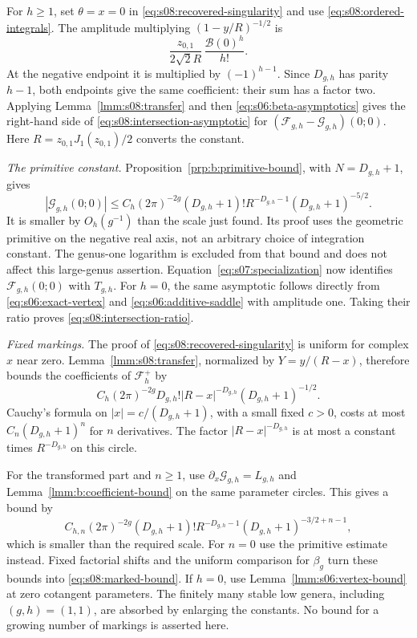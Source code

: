 \begin{prf}
For $h\geq1$, set $\theta=x=0$ in
\eqref{eq:s08:recovered-singularity} and use
\eqref{eq:s08:ordered-integrals}. The amplitude multiplying
$(1-y/R)^{-1/2}$ is
\[
 \frac{z_{0,1}}{2\sqrt2 R}\,
                         \frac{\mathcal B(0)^h}{h!}.
\]
At the negative endpoint it is multiplied by $(-1)^{h-1}$.
Since $D_{g,h}$ has parity $h-1$, both endpoints give the same
coefficient: their sum has a factor two. Applying
Lemma~\ref{lmm:s08:transfer} and then
\eqref{eq:s06:beta-asymptotics} gives the right-hand side of
\eqref{eq:s08:intersection-asymptotic} for
$(\mathcal F_{g,h}-\mathcal G_{g,h})(0;0)$.
Here $R=z_{0,1}J_1(z_{0,1})/2$ converts the constant.

\smallskip\noindent
\emph{The primitive constant.}
Proposition~\ref{prp:b:primitive-bound}, with $N=D_{g,h}+1$, gives
\[
 |\mathcal G_{g,h}(0;0)|
 \leq C_h(2\pi)^{-2g}(D_{g,h}+1)!
                  R^{-D_{g,h}-1}(D_{g,h}+1)^{-5/2}.
\]
It is smaller by $O_h(g^{-1})$ than the scale just found.
Its proof uses the geometric primitive on the negative real axis,
not an arbitrary choice of integration constant. The genus-one
logarithm is excluded from that bound and does not affect this
large-genus assertion. Equation~\eqref{eq:s07:specialization}
now identifies $\mathcal F_{g,h}(0;0)$ with $T_{g,h}$.
For $h=0$, the same asymptotic follows directly from
\eqref{eq:s06:exact-vertex} and \eqref{eq:s06:additive-saddle}
with amplitude one. Taking their ratio proves
\eqref{eq:s08:intersection-ratio}.

\smallskip\noindent
\emph{Fixed markings.}
The proof of \eqref{eq:s08:recovered-singularity} is uniform for
complex $x$ near zero. Lemma~\ref{lmm:s08:transfer}, normalized by
$Y=y/(R-x)$, therefore bounds the coefficients of
$\mathcal F_h^+$ by
\[
 C_h(2\pi)^{-2g}D_{g,h}!|R-x|^{-D_{g,h}}
                                      (D_{g,h}+1)^{-1/2}.
\]
Cauchy's formula on $|x|=c/(D_{g,h}+1)$, with a small fixed
$c>0$, costs at most $C_n(D_{g,h}+1)^n$ for $n$ derivatives.
The factor $|R-x|^{-D_{g,h}}$ is at most a constant times
$R^{-D_{g,h}}$ on this circle.

For the transformed part and
$n\geq1$, use $\partial_x\mathcal G_{g,h}=L_{g,h}$ and
Lemma~\ref{lmm:b:coefficient-bound} on the same parameter circles.
This gives a bound by
\[
 C_{h,n}(2\pi)^{-2g}(D_{g,h}+1)!R^{-D_{g,h}-1}
                  (D_{g,h}+1)^{-3/2+n-1},
\]
which is smaller than the required scale. For $n=0$ use the
primitive estimate instead. Fixed factorial shifts and the uniform
comparison for $\beta_g$ turn these bounds into
\eqref{eq:s08:marked-bound}. If $h=0$, use
Lemma~\ref{lmm:s06:vertex-bound} at zero cotangent parameters.
The finitely many stable low genera, including $(g,h)=(1,1)$,
are absorbed by enlarging the constants. No bound for a growing
number of markings is asserted here.
\end{prf}
